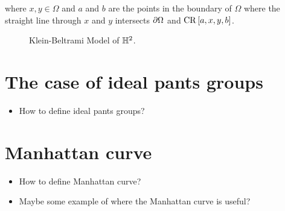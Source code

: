 \documentclass{amsart}
\begin{document}
	where $x,y \in \Omega$ and $a$ and $b$ are the points in the boundary of $\Omega$ where the straight line through $x$ and $y$ intersects $\partial \Omega$ and $\operatorname{CR}\left[a,x,y,b\right]$. 
	
	\begin{figure}[h]
		\caption{Klein-Beltrami Model of $\mathbb{H}^2$.}
		\label{fig:klein-beltrami}
	\end{figure}
	
	
	
	\begin{comment}
		If we have a strictly convex set $\Omega$ in $\RP^2$, we can construct a similar notion of a geodesic by drawing a line through any two points $x,y \in \Omega$ and label the places where the line intersects the boundary of $\Omega$ $a$ and $b$, respectively. The cross ratio $\crossratio{a,x,y,b} \geq 1$ and or geodesic is given by
		\begin{equation*}
			\metricd(x,y) = \frac{1}{2} \log \crossratio{a,x,y,b}.
		\end{equation*}
		
		As it turns out, there is exists an isometry between $\Hyp^2$ with the Hilbert length and $(\RP^2, \metricd)$, so it makes sense to also refer to $\metricd$ as the Hilbert length in $\RP^2$. \mytodo{I think this is correct, but it sounds a bit weird regardless, in my opinion}\todo[inline]{The isometry is between $\Hyp^2$ and a circle or an ellipse in $\mathbb{RP}^2$ with its Hilbert metric.}
	\end{comment}

	
	\section{The case of ideal pants groups}
		\begin{tcolorbox}[colback=myblue]
			\begin{itemize}
				\item How to define ideal pants groups?
			\end{itemize}
		\end{tcolorbox}
	
	\section{Manhattan curve}
	\begin{tcolorbox}[colback=myblue]
		\begin{itemize}
			\item How to define Manhattan curve?
			\item Maybe some example of where the Manhattan curve is useful?
		\end{itemize}
	\end{tcolorbox}
\end{document}
